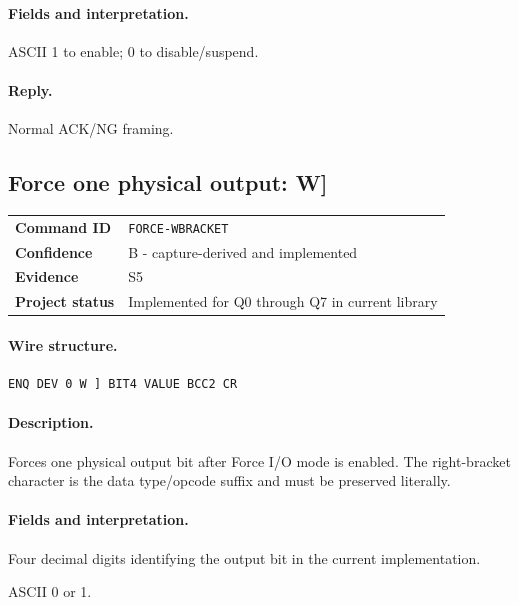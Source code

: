 \documentclass[10pt,letterpaper]{article}
\begin{document}
\paragraph{Fields and interpretation.}
\begin{description}[style=nextline,leftmargin=3.2cm,labelwidth=3.0cm,font=\normalfont\bfseries]
\item[VALUE] ASCII 1 to enable; 0 to disable/suspend.
\end{description}
\paragraph{Reply.} Normal ACK/NG framing.

\subsection{Force one physical output: W]}
\begin{tabularx}{\textwidth}{@{}>{\bfseries}p{2.8cm}X@{}}
Command ID & \texttt{FORCE-WBRACKET} \\
Confidence & B - capture-derived and implemented \\
Evidence & S5 \\
Project status & Implemented for Q0 through Q7 in current library \\
\end{tabularx}
\vspace{0.35em}
\paragraph{Wire structure.}
\begin{Verbatim}[breaklines=true,breakanywhere=true,fontsize=\small]
ENQ DEV 0 W ] BIT4 VALUE BCC2 CR
\end{Verbatim}
\paragraph{Description.} Forces one physical output bit after Force I/O mode is enabled. The right-bracket character is the data type/opcode suffix and must be preserved literally.
\paragraph{Fields and interpretation.}
\begin{description}[style=nextline,leftmargin=3.2cm,labelwidth=3.0cm,font=\normalfont\bfseries]
\item[BIT4] Four decimal digits identifying the output bit in the current implementation.
\item[VALUE] ASCII 0 or 1.
\end{description}
\end{document}
